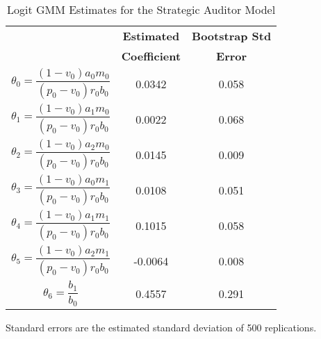 \begin{table}[t]
\caption{Logit GMM Estimates for the Strategic Auditor Model} \label{tab:gmm}


\begin{center}
\begin{tabular}{|c|cc|}
\hline
\T  &  {\bf Estimated}  & {\bf Bootstrap Std} \\ 
\B  & {\bf Coefficient} & {\bf Error} \\ \hline
\T $\theta_0= \dfrac{(1-v_0)a_0m_0}{(p_0-v_0)r_0b_0}$ & 0.0342 & 0.058\\[1.5em]
 $\theta_1=\dfrac{(1-v_0)a_1m_0}{(p_0-v_0)r_0b_0}$  &  0.0022 & 0.068 \\[1.5em]
$\theta_2=\dfrac{(1-v_0)a_2m_0}{(p_0-v_0)r_0b_0}$  &  0.0145   & 0.009\\[1.5em]
$\theta_3=\dfrac{(1-v_0)a_0m_1}{(p_0-v_0)r_0b_0}$  &  0.0108  & 0.051 \\[1.5em]
$\theta_4=\dfrac{(1-v_0)a_1m_1}{(p_0-v_0)r_0b_0}$ &  0.1015  & 0.058 \\[1.5em]
$\theta_5=\dfrac{(1-v_0)a_2m_1}{(p_0-v_0)r_0b_0}$ &  -0.0064  & 0.008 \\[1.5em]
\B$\theta_6=\dfrac{b_1}{b_0}$ &  0.4557  & 0.291\\[1.6em]
\hline
\end{tabular}
\end{center}
\vglue 10pt
Standard errors are the estimated standard deviation of 500 replications.
\end{table}
